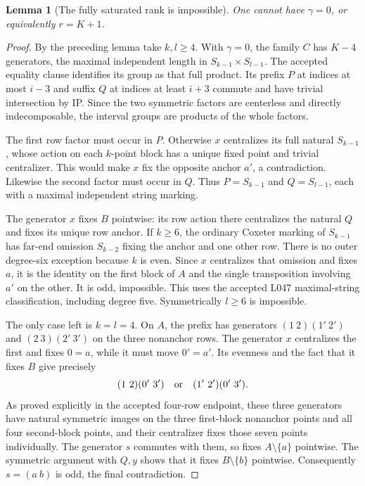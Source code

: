 \documentclass[11pt,a4paper]{article}
\newtheorem{lemma}{Lemma}
\begin{document}
\begin{lemma}[The fully saturated rank is impossible]
One cannot have $\gamma=0$, or equivalently $r=K+1$.
\end{lemma}
\begin{proof}
By the preceding lemma take $k,l\geq4$. With $\gamma=0$,
the family $C$ has $K-4$ generators, the maximal independent
length in $S_{k-1}\times S_{l-1}$. The accepted equality
clause identifies its group as that full product.
Its prefix $P$ at indices at most $i-3$ and suffix $Q$
at indices at least $i+3$ commute and have trivial
intersection by IP. Since the two symmetric factors are
centerless and directly indecomposable, the interval groups
are products of the whole factors.

The first row factor must occur in $P$. Otherwise $x$
centralizes its full natural $S_{k-1}$, whose action on
each $k$-point block has a unique fixed point and trivial
centralizer. This would make $x$ fix the opposite anchor
$a'$, a contradiction. Likewise the second factor must
occur in $Q$. Thus $P=S_{k-1}$ and $Q=S_{l-1}$,
each with a maximal independent string marking.

The generator $x$ fixes $B$ pointwise: its row action there
centralizes the natural $Q$ and fixes its unique row anchor.
If $k\geq6$, the ordinary Coxeter marking of $S_{k-1}$
has far-end omission $S_{k-2}$ fixing the anchor and one
other row. There is no outer degree-six exception because
$k$ is even. Since $x$ centralizes that omission and fixes
$a$, it is the identity on the first block of $A$ and
the single transposition involving $a'$ on the other.
It is odd, impossible. This uses the accepted L047
maximal-string classification, including degree five.
Symmetrically $l\geq6$ is impossible.

The only case left is $k=l=4$. On $A$, the prefix has
generators $(1\ 2)(1'\ 2')$ and $(2\ 3)(2'\ 3')$ on
the three nonanchor rows. The generator $x$ centralizes
the first and fixes $0=a$, while it must move $0'=a'$.
Its evenness and the fact that it fixes $B$ give precisely
\[
 (1\ 2)(0'\ 3')\quad\hbox{or}\quad
 (1'\ 2')(0'\ 3').
\]
As proved explicitly in the accepted four-row endpoint,
these three generators have natural symmetric images on
the three first-block nonanchor points and all four
second-block points, and their centralizer fixes those
seven points individually. The generator $s$ commutes
with them, so fixes $A\setminus\{a\}$ pointwise.
The symmetric argument with $Q,y$ shows that it fixes
$B\setminus\{b\}$ pointwise. Consequently $s=(a\ b)$
is odd, the final contradiction.
\end{proof}
\end{document}
